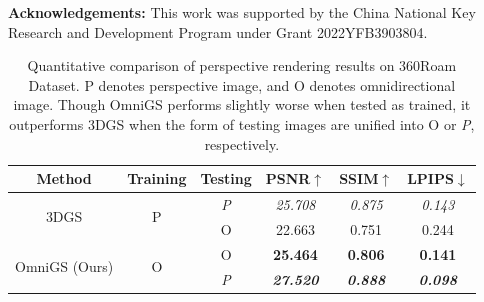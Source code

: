\documentclass[10pt,twocolumn,letterpaper]{article}
\begin{document}
\noindent\textbf{Acknowledgements:}
{This work was supported by the China National Key Research and Development Program under Grant 2022YFB3903804.}

\begin{table}
\centering
\footnotesize
\tabcolsep=0.1cm
\begin{tabular}{c|c|c|ccc}
    \hline
    \textbf{Method} & \textbf{Training} &\textbf{Testing}& \textbf{PSNR$\uparrow$} & \textbf{SSIM$\uparrow$} & \textbf{LPIPS$\downarrow$} \\
    \hline
    \multirow{2}{*}{3DGS\cite{3dgs}}  
      & \multirow{2}{*}{P} & \textit{P} & \textit{25.708} & \textit{0.875} & \textit{0.143} \\%
      &  & O & 22.663 & 0.751 & 0.244 \\\hline
    \multirow{2}{*}{OmniGS (Ours)} 
      &\multirow{2}{*}{O} & O & \textbf{25.464} & \textbf{0.806} & \textbf{0.141} \\%
      & & \textit{P} & \textbf{\textit{27.520}} & \textbf{\textit{0.888}} & \textbf{\textit{0.098}} \\\hline
\end{tabular}
\caption{Quantitative comparison of perspective rendering results on 360Roam Dataset. P denotes perspective image, and O denotes omnidirectional image. {Though OmniGS performs slightly worse when tested as trained, it outperforms 3DGS when the form of testing images are unified into O or \textit{P}, respectively.}}\label{tab:perspective}
\vspace{-8pt}
\end{table}

{\small


}
\end{document}
